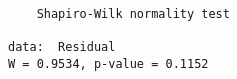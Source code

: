 \begin{verbatim} 

	Shapiro-Wilk normality test

data:  Residual
W = 0.9534, p-value = 0.1152

\end{verbatim}